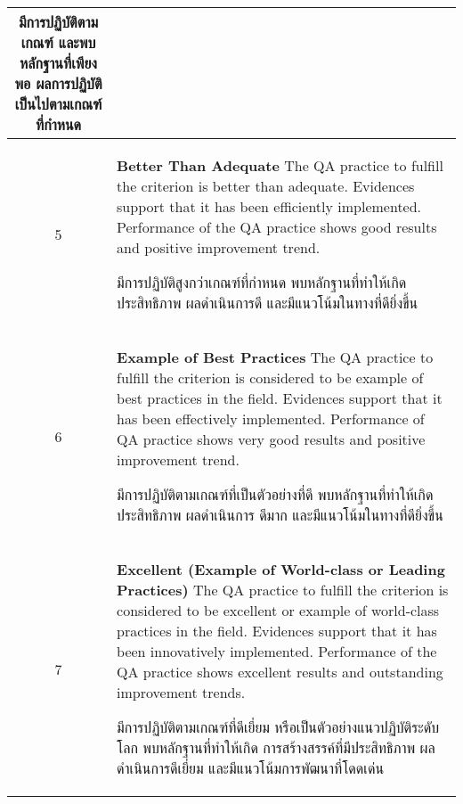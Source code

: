 \begin{longtable}{|c|p{}|}
มีการปฏิบัติตามเกณฑ์ และพบหลักฐานที่เพียงพอ ผลการปฏิบัติเป็นไปตามเกณฑ์ที่กำหนด\\\hline

5&\textbf{Better Than Adequate}\newline  
The QA practice to fulfill the criterion is better than adequate. Evidences support that it has been efficiently implemented. Performance of the QA practice shows good results and positive improvement trend.\newline

มีการปฏิบัติสูงกว่าเกณฑ์ที่กำหนด พบหลักฐานที่ทำให้เกิดประสิทธิภาพ ผลดำเนินการดี และมีแนวโน้มในทางที่ดียิ่งขึ้น\\\hline

6&\textbf{Example of Best Practices}\newline 
The QA practice to fulfill the criterion is considered to be example of best practices in the field. Evidences support that it has been effectively implemented. Performance of QA practice shows very good results and positive improvement trend.\newline 
 
มีการปฏิบัติตามเกณฑ์ที่เป็นตัวอย่างที่ดี พบหลักฐานที่ทำให้เกิดประสิทธิภาพ ผลดำเนินการ
ดีมาก และมีแนวโน้มในทางที่ดียิ่งขึ้น \\\hline

7&\textbf{Excellent (Example of World-class or Leading Practices)}\newline 
The QA practice to fulfill the criterion is considered to be excellent or example of world-class practices in the field. Evidences support that it has been innovatively implemented. Performance of the QA practice shows excellent results and outstanding improvement trends.\newline

มีการปฏิบัติตามเกณฑ์ที่ดีเยี่ยม หรือเป็นตัวอย่างแนวปฏิบัติระดับโลก พบหลักฐานที่ทำให้เกิด
การสร้างสรรค์ที่มีประสิทธิภาพ ผลดำเนินการดีเยี่ยม และมีแนวโน้มการพัฒนาที่โดดเด่น \\\hline
\end{longtable}

